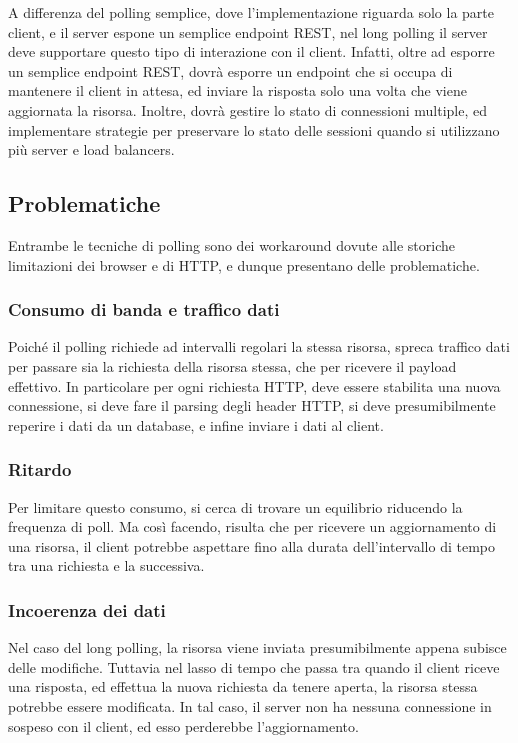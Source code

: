 \documentclass[12pt,a4paper,openright]{report}
\begin{document}
\begin{description}
A differenza del polling semplice, dove l’implementazione riguarda solo la parte client, e il server espone un semplice endpoint REST, nel long polling il server deve supportare questo tipo di interazione con il client. Infatti, oltre ad esporre un semplice endpoint REST, dovrà esporre un endpoint che si occupa di mantenere il client in attesa, ed inviare la risposta solo una volta che viene aggiornata la risorsa. Inoltre, dovrà gestire lo stato di connessioni multiple, ed implementare strategie per preservare lo stato delle sessioni quando si utilizzano più server e load balancers.

\end{description}

\subsection{Problematiche}
Entrambe le tecniche di polling sono dei workaround dovute alle storiche limitazioni dei browser e di HTTP, e dunque presentano delle problematiche. 
\subsubsection{Consumo di banda e traffico dati}
Poiché il polling richiede ad intervalli regolari la stessa risorsa, spreca traffico dati per passare sia la richiesta della risorsa stessa, che per ricevere il payload effettivo. In particolare per ogni richiesta HTTP, deve essere stabilita una nuova connessione, si deve fare il parsing degli header HTTP, si deve presumibilmente reperire i dati da un database, e infine inviare i dati al client.

\subsubsection{Ritardo}
Per limitare questo consumo, si cerca di trovare un equilibrio riducendo la frequenza di poll. Ma così facendo, risulta che per ricevere un aggiornamento di una risorsa, il client potrebbe aspettare fino alla durata dell’intervallo di tempo tra una richiesta e la successiva.

\subsubsection{Incoerenza dei dati}
Nel caso del long polling, la risorsa viene inviata presumibilmente appena subisce delle modifiche. Tuttavia nel lasso di tempo che passa tra quando il client riceve una risposta, ed effettua la nuova richiesta da tenere aperta, la risorsa stessa potrebbe essere modificata. In tal caso, il server non ha nessuna connessione in sospeso con il client, ed esso perderebbe l’aggiornamento. 
\end{document}
